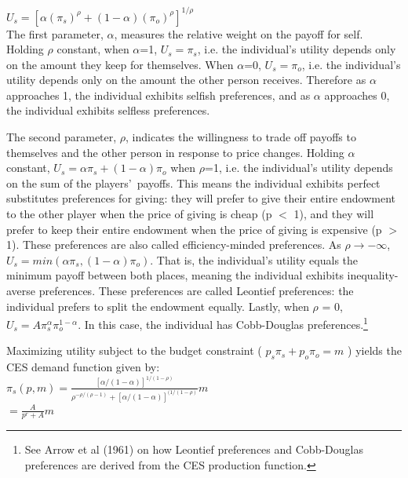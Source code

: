\documentclass[12pt]{article}
\begin{document}
\(U_{s} = [\alpha(\pi_{s})^{\rho} + (1-\alpha)(\pi_{o})^{\rho}]^{1/\rho}\) \\


The first parameter, \(\alpha\), measures the relative weight on the payoff for self. Holding \(\rho\) constant, when \(\alpha\)=1, \(U_{s} = \pi_{s}\), i.e. the individual\rq s utility depends only on the amount they keep for themselves. When \(\alpha\)=0, \(U_{s} = \pi_{o}\), i.e. the individual\rq s utility depends only on the amount the other person receives. Therefore as \(\alpha\) approaches 1, the individual exhibits selfish preferences, and as \(\alpha\) approaches 0, the individual exhibits selfless preferences.

The second parameter, \(\rho\), indicates the willingness to trade off payoffs to themselves and the other person in response to price changes. Holding \(\alpha\) constant, \(U_{s} = \alpha\pi_{s} + (1-\alpha)\pi_{o}\) when \(\rho\)=1,  i.e. the individual\rq s utility depends on the sum of the players\rq \ payoffs. This means the individual exhibits perfect substitutes preferences for giving: they will prefer to give their entire endowment to the other player when the price of giving is cheap (p $<$ 1), and they will prefer to keep their entire endowment when the price of giving is expensive (p $>$ 1). These preferences are also called efficiency-minded preferences. As \(\rho \rightarrow -\infty\), \(U_{s} = min(\alpha\pi_{s}, (1-\alpha)\pi_{o})\). That is, the individual\rq s utility equals the minimum payoff between both places, meaning the individual exhibits inequality-averse preferences. These preferences are called Leontief preferences: the individual prefers to split the endowment equally. Lastly, when \(\rho\) = 0, \(U_{s} = A\pi_{s}^{\alpha}\pi_{o}^{1-\alpha}\). In this case, the individual has Cobb-Douglas preferences.\footnote{See Arrow et al (1961) on how Leontief preferences and Cobb-Douglas preferences are derived from the CES production function.}

Maximizing utility subject to the budget constraint ( \(p_{s}\pi_{s} + p_{o}\pi_{o}=m\) ) yields the CES demand function given by: \\
 

\(\pi_{s}(p,m)=\frac{[\alpha/(1-\alpha)]^{1/(1-\rho)}}{\rho^{-\rho/(\rho-1)}+[\alpha/(1-\alpha)]^{(1/(1-\rho)}}m\) \\

\hspace{14.5mm} \(= \frac{A}{p^{r}+A}m\) \\
 
\end{document}
